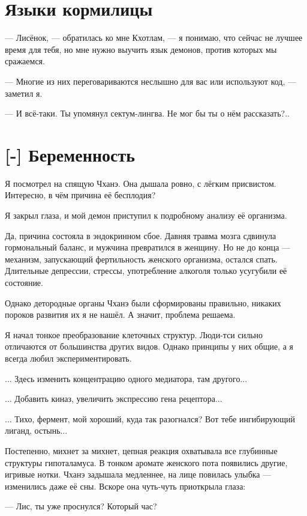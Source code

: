 \section{Языки кормилицы}

--- Лисёнок, --- обратилась ко мне Кхотлам, --- я понимаю, что сейчас не лучшее время для тебя, но мне нужно выучить язык демонов, против которых мы сражаемся.

--- Многие из них переговариваются неслышно для вас или используют код, --- заметил я.

--- И всё-таки.
Ты упомянул сектум-лингва.
Не мог бы ты о нём рассказать?..

\section{[-] Беременность}

\textspace

Я посмотрел на спящую Чханэ.
Она дышала ровно, с лёгким присвистом.
Интересно, в чём причина её бесплодия?

Я закрыл глаза, и мой демон приступил к подробному анализу её организма.

Да, причина состояла в эндокринном сбое.
Давняя травма мозга сдвинула гормональный баланс, и мужчина превратился в женщину.
Но не до конца --- механизм, запускающий фертильность женского организма, остался спать.
Длительные депрессии, стрессы, употребление алкоголя только усугубили её состояние.

Однако детородные органы Чханэ были сформированы правильно, никаких пороков развития их я не нашёл.
А значит, проблема решаема.

Я начал тонкое преобразование клеточных структур.
Люди-тси сильно отличаются от большинства других видов.
Однако принципы у них общие, а я всегда любил экспериментировать.

... Здесь изменить концентрацию одного медиатора, там другого...

... Добавить киназ, увеличить экспрессию гена рецептора...

... Тихо, фермент, мой хороший, куда так разогнался?
Вот тебе ингибирующий лиганд, остынь...

Постепенно, михнет за михнет, цепная реакция охватывала все глубинные структуры гипоталамуса.
В тонком аромате женского пота появились другие, игривые нотки.
Чханэ задышала медленнее, на лице повилась улыбка --- изменились даже её сны.
Вскоре она чуть-чуть приоткрыла глаза:

--- Лис, ты уже проснулся?
Который час?

